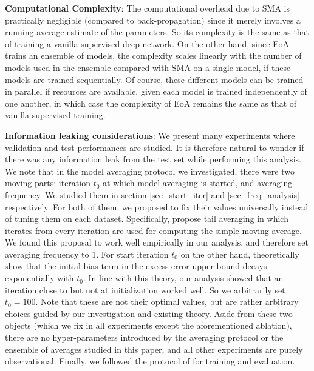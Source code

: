 \textbf{Computational Complexity}: The computational overhead due to SMA is practically negligible (compared to back-propagation) since it merely involves a running average estimate of the parameters. So its complexity is the same as that of training a vanilla supervised deep network. On the other hand, since EoA trains an ensemble of models, the complexity scales linearly with the number of models used in the ensemble compared with SMA on a single model, if these models are trained sequentially. Of course, these different models can be trained in parallel if resources are available, given each model is trained independently of one another, in which case the complexity of EoA remains the same as that of vanilla supervised training.

\textbf{Information leaking considerations}: We present many experiments where validation and test performances are studied. It is therefore natural to wonder if there was any information leak from the test set while performing this analysis. We note that in the model averaging protocol we investigated, there were two moving parts: iteration $t_0$ at which model averaging is started, and averaging frequency. We studied them in section \ref{sec_start_iter} and \ref{sec_freq_analysis} respectively. For both of them, we proposed to fix their values universally instead of tuning them on each dataset. Specifically, \cite{jain2018parallelizing} propose tail averaging in which iterates from every iteration are used for computing the simple moving average. We found this proposal to work well empirically in our analysis, and therefore set averaging frequency to 1. For start iteration $t_0$ on the other hand, \cite{jain2018parallelizing} theoretically show that the initial bias term in the excess error upper bound decays exponentially with $t_0$. In line with this theory, our analysis showed that an iteration close to but not at initialization worked well. So we arbitrarily set $t_0=100$. Note that these are not their optimal values, but are rather arbitrary choices guided by our investigation and existing theory. Aside from these two objects (which we fix in all experiments except the aforementioned ablation), there are no hyper-parameters introduced by the averaging protocol or the ensemble of averages studied in this paper, and all other experiments are purely observational. Finally, we followed the protocol of \cite{gulrajani2020search} for training and evaluation.

